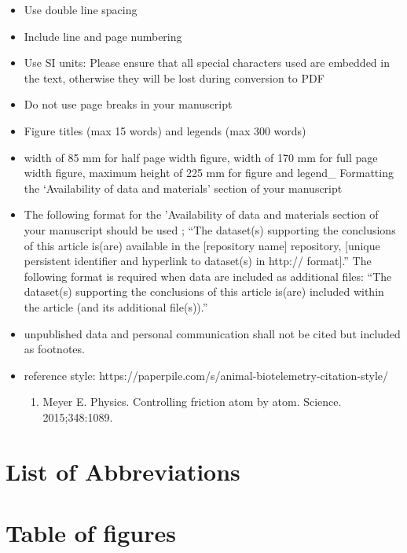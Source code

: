 \documentclass[
  authoryear,
  review,
  3p]{elsarticle}
\providecommand{\tightlist}{%
  \setlength{\itemsep}{0pt}\setlength{\parskip}{0pt}}\usepackage{longtable,booktabs,array}
\begin{document}
\begin{itemize}
\tightlist
\item
  Use double line spacing
\item
  Include line and page numbering
\item
  Use SI units: Please ensure that all special characters used are
  embedded in the text, otherwise they will be lost during conversion to
  PDF
\item
  Do not use page breaks in your manuscript
\item
  Figure titles (max 15 words) and legends (max 300 words)
\item
  width of 85 mm for half page width figure, width of 170 mm for full
  page width figure, maximum height of 225 mm for figure and legend\_
  Formatting the `Availability of data and materials' section of your
  manuscript
\item
  The following format for the 'Availability of data and materials
  section of your manuscript should be used ; ``The dataset(s)
  supporting the conclusions of this article is(are) available in the
  {[}repository name{]} repository, {[}unique persistent identifier and
  hyperlink to dataset(s) in http:// format{]}.'' The following format
  is required when data are included as additional files: ``The
  dataset(s) supporting the conclusions of this article is(are) included
  within the article (and its additional file(s)).''
\item
  unpublished data and personal communication shall not be cited but
  included as footnotes.
\item
  reference style:
  https://paperpile.com/s/animal-biotelemetry-citation-style/

  \begin{enumerate}
  \def\labelenumi{\arabic{enumi}.}
  \tightlist
  \item
    Meyer E. Physics. Controlling friction atom by atom. Science.
    2015;348:1089.
  \end{enumerate}
\end{itemize}

\newpage{}

\hypertarget{list-of-abbreviations}{%
\section*{List of Abbreviations}\label{list-of-abbreviations}}

\hypertarget{table-of-figures}{%
\section{Table of figures}\label{table-of-figures}}
\end{document}
